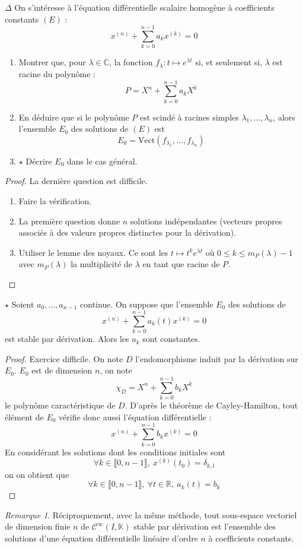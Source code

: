 \documentclass[french,a4paper]{article}
\newcommand{\R}{\mathbb{R}}
\newcommand{\C}{\mathbb{C}}
\newcommand{\K}{\mathbb{K}}
\theoremstyle{plain}
\theoremstyle{definition}
\theoremstyle{remark}
\newtheorem*{rmq}{Remarque}
\begin{document}
\begin{ex}[Moulin.ED.42]{$\Delta$}
	On s'intéresse à l'équation différentielle scalaire homogène à coefficients constants $(E)$ : $$x^{(n)}+\sum_{k=0}^{n-1}a_kx^{(k)}=0$$
	\begin{enumerate}
		\item Montrer que, pour $\lambda\in\C$, la fonction $f_\lambda :t\mapsto e^{\lambda t}$ si, et seulement si, $\lambda$ est racine du polynôme : $$P=X^n+\sum_{k=0}^{n-1}a_kX^k$$
		\item En déduire que si le polynôme $P$ est scindé à racines simples $\lambda_1,\ldots,\lambda_n$, alors l'ensemble $E_0$ des solutions de $(E)$ est $$E_0=\text{Vect}(f_{\lambda_1},\ldots,f_{\lambda_n})$$
		\item $\star$ Décrire $E_0$ dans le cas général.
	\end{enumerate}
\end{ex}
\begin{proof}
	La dernière question est difficile.
	\begin{enumerate}
		\item Faire la vérification.
		\item La première question donne $n$ solutions indépendantes (vecteurs propres associés à des valeurs propres distinctes pour la dérivation).
		\item Utiliser le lemme des noyaux. Ce sont les $t\mapsto t^ke^{\lambda t}$ où $0\leqslant k\leqslant m_P(\lambda)-1$ avec $m_P(\lambda)$ la multiplicité de $\lambda$ en tant que racine de $P$.
	\end{enumerate}
\end{proof}

\begin{ex}[Moulin.ED.43]{$\star$}
	Soient $a_0,\ldots,a_{n-1}$ continue. On suppose que l'ensemble $E_0$ des solutions de $$x^{(n)}+\sum_{k=0}^{n-1}a_k(t)x^{(k)}=0$$ est stable par dérivation. Alors les $a_k$ sont constantes.
\end{ex}
\begin{proof}
	Exercice difficile. On note $D$ l'endomorphisme induit par la dérivation sur $E_0$. $E_0$ est de dimension $n$, on note $$\chi_D=X^n+\sum_{k=0}^{n-1}b_kX^k$$ le polynôme caractéristique de $D$. D'après le théorème de Cayley-Hamilton, tout élément de $E_0$ vérifie donc aussi l'équation différentielle : $$x^{(n)}+\sum_{k=0}^{n-1}b_kx^{(k)}=0$$ En considérant les solutions dont les conditions initiales sont $$\forall k\in\llbracket0,n-1\rrbracket,\ x^{(k)}(t_0)=\delta_{k,l}$$ on on obtient que $$\forall k\in\llbracket0,n-1\rrbracket,\ \forall t\in\R,\ a_k(t)=b_k$$
\end{proof}
\begin{rmq}
	Réciproquement, avec la même méthode, tout sous-espace vectoriel de dimension finie $n$ de $\mathcal{C}^{\infty}(I,\K)$ stable par dérivation est l'ensemble des solutions d'une équation différentielle linéaire d'ordre $n$ à coefficients constants.
\end{rmq}
\end{document}
